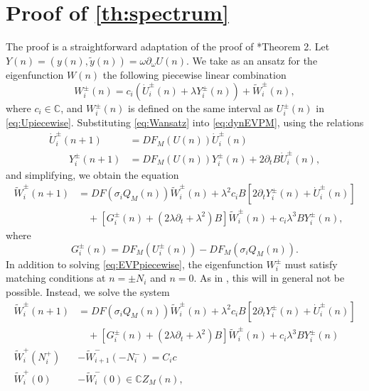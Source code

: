 \documentclass[12pt,reqno]{amsart}
\def\C{{\mathbb C}}
\theoremstyle{definition}
\begin{document}
\appendix

\section{Proof of \texorpdfstring{\cref{th:spectrum}}{Theorem 2} }\label{app:specproof}

The proof is a straightforward adaptation of the proof of \cite{Parker2020}*{Theorem 2}. Let $Y(n) = (y(n), \tilde{y}(n)) = \omega \partial_\omega U(n)$. We take as an ansatz for the eigenfunction $W(n)$ the following piecewise linear combination
\begin{equation}\label{eq:Wansatz}
W_i^\pm(n) = c_i ( \dot{U}_i^\pm(n) + \lambda Y_i^\pm(n) ) + \tilde{W}_i^\pm(n),
\end{equation}
where $c_i \in \C$, and $W_i^\pm(n)$ is defined on the same interval as $U_i^\pm(n)$ in \cref{eq:Upiecewise}. Substituting \cref{eq:Wansatz} into \cref{eq:dynEVPM}, using the relations
\begin{equation}
\begin{aligned}
\dot{U}_i^\pm(n+1) &= DF_M(U(n))\dot{U}_i^\pm(n) \\ 
\qquad Y_i^\pm(n+1) &= DF_M(U(n)) Y_i^\pm(n) + 2 \partial_t B \dot{U}_i^\pm(n),
\end{aligned}
\end{equation}
and simplifying, we obtain the equation
\begin{equation}\label{eq:EVPpiecewise}
\begin{aligned}
\tilde{W}_i^\pm(n+1) &= DF(\sigma_i Q_M(n)) \tilde{W}_i^\pm(n) + \lambda^2 c_i B[ 2 \partial_t Y_i^\pm(n) + \dot{U}_i^\pm(n)] \\
&\quad+ [G_i^\pm(n) + (2 \lambda \partial_t + \lambda^2) B] \tilde{W}_i^\pm(n) + c_i \lambda^3 B Y_i^\pm(n),
\end{aligned}
\end{equation}
where
\begin{equation}\label{eq:Gipm}
G_i^\pm(n) = DF_M(U_i^\pm(n)) - DF_M(\sigma_i Q_M(n)).
\end{equation}
In addition to solving \cref{eq:EVPpiecewise}, the eigenfunction $W_i^\pm$ must satisfy matching conditions at $n = \pm N_i$ and $n = 0$. As in \cites{Parker2020,Parker2021,Sandstede1998}, this will in general not be possible. Instead, we solve the system 
\begin{equation}\label{eq:EVPsystem}
\begin{aligned}
\tilde{W}_i^\pm(n+1) &= DF(\sigma_i Q_M(n)) \tilde{W}_i^\pm(n) + \lambda^2 c_i B[ 2 \partial_t Y_i^\pm(n) + \dot{U}_i^\pm(n)] \\
&\quad+ [G_i^\pm(n) + (2 \lambda \partial_t + \lambda^2) B] \tilde{W}_i^\pm(n) + c_i \lambda^3 B Y_i^\pm(n) \\
\tilde{W}_i^+(N_i^+) &- \tilde{W}_{i+1}^-(-N_i^-) = C_i c \\
\tilde{W}_i^+(0) &- \tilde{W}_i^-(0) \in \C Z_M(n),
\end{aligned}
\end{equation}
\end{document}
